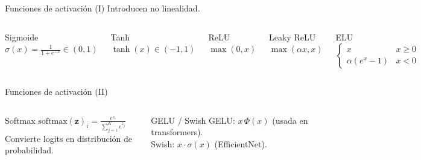 \documentclass[aspectratio=169, 10pt, xcolor=table]{beamer}
\begin{document}
\begin{frame}{Funciones de activación (I)}
    Introducen no linealidad.
    \begin{columns}[t]
        \begin{block}{Sigmoide}
            $\sigma(x)=\frac{1}{1+e^{-x}}\in(0,1)$
        \end{block}
        \begin{block}{Tanh}
            $\tanh(x)\in(-1,1)$
        \end{block}
        \begin{block}{ReLU}
            $\max(0,x)$
        \end{block}
        \begin{block}{Leaky ReLU}
            $\max(\alpha x,x)$
        \end{block}
        \begin{block}{ELU}
            $\begin{cases}x&x\ge0\\ \alpha(e^x-1)&x<0\end{cases}$
        \end{block}
    \end{columns}
\end{frame}

\begin{frame}{Funciones de activación (II)}
    \begin{columns}[t]
        \begin{block}{Softmax}
            $\displaystyle \text{softmax}(\mathbf{z})_i = \frac{e^{z_i}}{\sum_{j=1}^K e^{z_j}}$ \\
            Convierte logits en distribución de probabilidad.
        \end{block}
        \begin{block}{GELU / Swish}
            GELU: $x\,\Phi(x)$ (usada en transformers). \\
            Swish: $x\cdot\sigma(x)$ (EfficientNet).
        \end{block}
    \end{columns}
\end{frame}
\end{document}
